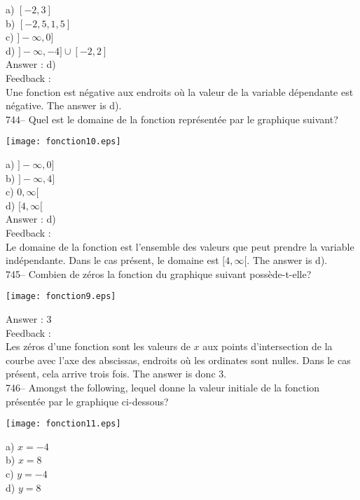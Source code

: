\documentclass[letterpaper, 12pt]{article}
\begin{document}
a) $[-2, 3]$\\
b) $[-2,5, 1,5]$\\
c) $]-\infty,0]$\\
d) $]-\infty,-4]\cup[-2,2]$\\

Answer : d)\\

Feedback : \\
Une fonction est n\'egative aux endroits o\`u la valeur de la variable
d\'ependante est n\'egative.  The answer is d).\\

744-- Quel est le domaine de la fonction repr\'esent\'ee par le graphique
suivant?\\

    \begin{center}
    \texttt{[image: fonction10.eps]}
    \end{center}
a) $]-\infty,0]$\\
b) $]-\infty,4]$\\
c) $0,\infty[$\\
d) $[4, \infty[$\\

Answer : d)\\

Feedback : \\
Le domaine de la fonction est l'ensemble des valeurs que peut prendre la
variable ind\'ependante.  Dans le cas pr\'esent, le domaine est $[4,
\infty[$.  The answer is d).\\

745-- Combien de z\'eros la fonction du graphique suivant
poss\`ede-t-elle?\\
    \begin{center}
    \texttt{[image: fonction9.eps]}
    \end{center}

Answer : 3\\

Feedback : \\
Les z\'eros d'une fonction sont les valeurs de $x$ aux points d'intersection
de la courbe avec l'axe des abscissas, endroits o\`u les ordinates sont
nulles.  Dans le cas pr\'esent, cela arrive trois fois.  The answer is
donc 3.\\

746-- Amongst the following, lequel donne la valeur initiale de la
fonction pr\'esent\'ee par le graphique ci-dessous?\\
    \begin{center}
    \texttt{[image: fonction11.eps]}
    \end{center}
a) $x=-4$\\
b) $x=8$\\
c) $y=-4$\\
d) $y=8$\\
\end{document}

